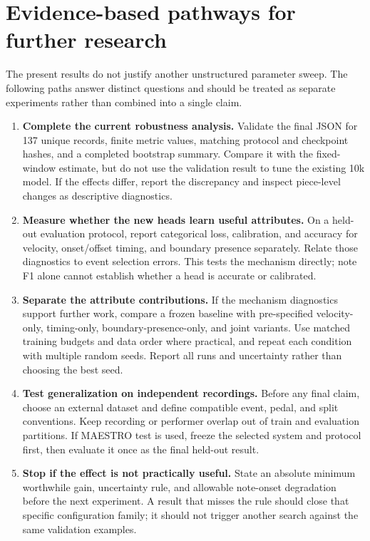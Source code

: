 \documentclass[11pt]{article}
\begin{document}
\section{Evidence-based pathways for further research}

The present results do not justify another unstructured parameter sweep.
The following paths answer distinct questions and should be treated as
separate experiments rather than combined into a single claim.

\begin{enumerate}
  \item \textbf{Complete the current robustness analysis.} Validate the
        final JSON for 137 unique records, finite metric values, matching
        protocol and checkpoint hashes, and a completed bootstrap summary.
        Compare it with the fixed-window estimate, but do not use the
        validation result to tune the existing 10k model. If the effects
        differ, report the discrepancy and inspect piece-level changes as
        descriptive diagnostics.
  \item \textbf{Measure whether the new heads learn useful attributes.}
        On a held-out evaluation protocol, report categorical loss,
        calibration, and accuracy for velocity, onset/offset timing, and
        boundary presence separately. Relate those diagnostics to event
        selection errors. This tests the mechanism directly; note F1 alone
        cannot establish whether a head is accurate or calibrated.
  \item \textbf{Separate the attribute contributions.} If the mechanism
        diagnostics support further work, compare a frozen baseline with
        pre-specified velocity-only, timing-only, boundary-presence-only,
        and joint variants. Use matched training budgets and data order
        where practical, and repeat each condition with multiple random
        seeds. Report all runs and uncertainty rather than choosing the
        best seed.
  \item \textbf{Test generalization on independent recordings.} Before any
        final claim, choose an external dataset and define compatible
        event, pedal, and split conventions. Keep recording or performer
        overlap out of train and evaluation partitions. If MAESTRO test is
        used, freeze the selected system and protocol first, then evaluate
        it once as the final held-out result.
  \item \textbf{Stop if the effect is not practically useful.} State an
        absolute minimum worthwhile gain, uncertainty rule, and allowable
        note-onset degradation before the next experiment. A result that
        misses the rule should close that specific configuration family;
        it should not trigger another search against the same validation
        examples.
\end{enumerate}
\end{document}
